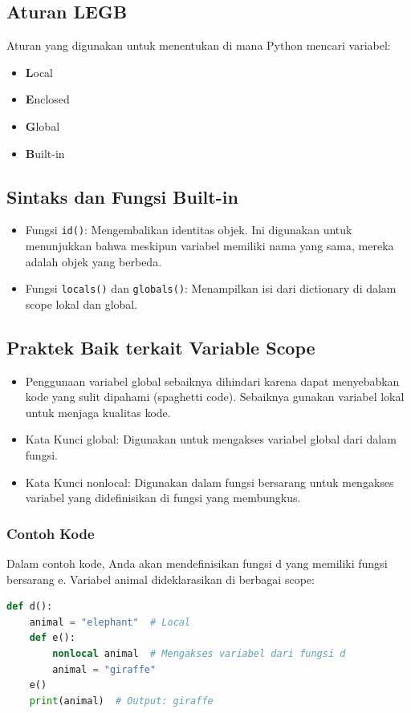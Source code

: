 \documentclass{article}
\begin{document}
\subsection{Aturan LEGB}
Aturan yang digunakan untuk menentukan di mana Python mencari variabel:
\begin{itemize}
    \item \textbf{L}ocal
    \item \textbf{E}nclosed
    \item \textbf{G}lobal
    \item \textbf{B}uilt-in
\end{itemize}

\subsection{Sintaks dan Fungsi Built-in}
\begin{itemize}
    \item Fungsi \verb|id()|: Mengembalikan identitas objek. Ini digunakan untuk menunjukkan bahwa meskipun variabel memiliki nama yang sama, mereka adalah objek yang berbeda.
    \item Fungsi \verb|locals()| dan \verb|globals()|: Menampilkan isi dari dictionary di dalam scope lokal dan global.
\end{itemize}

\subsection{Praktek Baik terkait Variable Scope}
\begin{itemize}
    \item Penggunaan variabel global sebaiknya dihindari karena dapat menyebabkan kode yang sulit dipahami (spaghetti code). Sebaiknya gunakan variabel lokal untuk menjaga kualitas kode.
    \item Kata Kunci global: Digunakan untuk mengakses variabel global dari dalam fungsi.
    \item Kata Kunci nonlocal: Digunakan dalam fungsi bersarang untuk mengakses variabel yang didefinisikan di fungsi yang membungkus.
\end{itemize}

\subsubsection{Contoh Kode}
Dalam contoh kode, Anda akan mendefinisikan fungsi d yang memiliki fungsi bersarang e. Variabel animal dideklarasikan di berbagai scope:
\begin{lstlisting}[language=Python, caption={}, captionpos=b]
def d():
    animal = "elephant"  # Local
    def e():
        nonlocal animal  # Mengakses variabel dari fungsi d
        animal = "giraffe"
    e()
    print(animal)  # Output: giraffe
\end{lstlisting}
\end{document}
